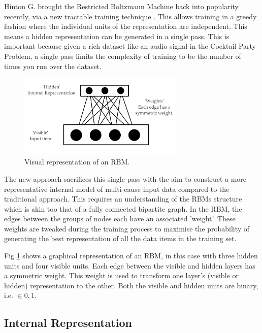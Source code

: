 Hinton G. brought the Restricted Boltzmann Machine back into popularity recently, via a new tractable training technique \cite{Hinton:2006dk}. This allows training in a greedy fashion where the individual units of the representation are independent. This means a hidden representation can be generated in a single pass. This is important because given a rich dataset like an audio signal in the Cocktail Party Problem, a single pass limits the complexity of training to be the number of times you run over the dataset.

\begin{figure}[htbp]
\begin{center}
	\includegraphics[width=0.7\textwidth]{Assets/RBMimage}
\caption{Visual representation of an RBM.}
\label{F:rbm}
\end{center}
\end{figure}

The new approach sacrifices this single pass with the aim to construct a more representative internal model of multi-cause input data compared to the traditional approach. This requires an understanding of the RBMs structure which is akin too that of a fully connected bipartite graph. In the RBM, the edges between the groups of nodes each have an associated 'weight'. These weights are tweaked during the training process to maximise the probability of generating the best representation of all the data items in the training set.

Fig \ref{F:rbm} shows a graphical representation of an RBM, in this case with three hidden units and four visible units. Each edge between the visible and hidden layers has a symmetric weight. This weight is used to transform one layer's (visible or hidden) representation to the other. Both the visible and hidden units are binary, i.e. $ \in {0,1} $.

\subsection{Internal Representation}\label{SS:repr}

